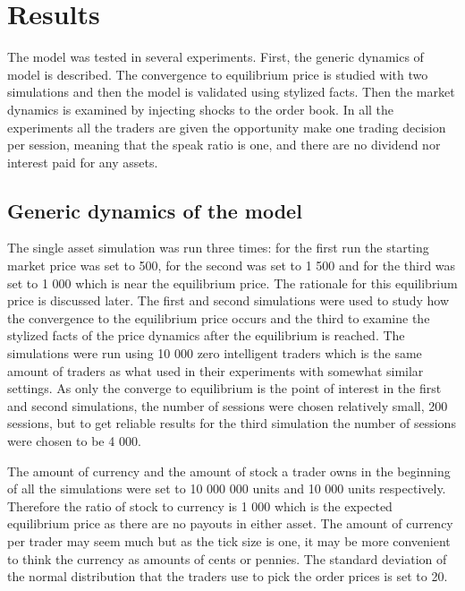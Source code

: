 
\section{Results}

The model was tested in several experiments. First, the generic dynamics of 
model is described. The convergence to equilibrium price is studied with two
simulations and then the model is validated using stylized facts. Then the
market dynamics is examined by injecting shocks to the order book. In all the experiments
all the traders are given the opportunity make one trading decision per session,
meaning that the speak ratio is one, and there are no dividend nor interest paid 
for any assets.

\subsection{Generic dynamics of the model}
The single asset simulation was run three times: for the first run
the starting market price was set to 500, for the second
was set to 1 500 and for the third was set to 1 000 which is near the equilibrium price. 
The rationale for this equilibrium price is discussed later.
The first and second simulations were
used to study how the convergence to the equilibrium price occurs
and the third to examine the stylized facts of the price
dynamics after the equilibrium is reached. The simulations were
run using 10 000 zero intelligent traders which is the 
same amount of traders as what \citet{Raberto05} used in their experiments
with somewhat similar settings. As only the converge to equilibrium is 
the point of interest in the first and second simulations, the number of sessions
were chosen relatively small, 200 sessions, but to get reliable results for
the third simulation the number of sessions were chosen to be 4 000.

The amount of currency and the amount of stock 
a trader owns in the beginning of all the simulations were set to
10 000 000 units and 10 000 units respectively. Therefore
the ratio of stock to currency is 1 000 which
is the expected equilibrium price as there are
no payouts in either asset. The amount of currency
per trader may seem much but as the tick size is one,
it may be more convenient to think the currency as amounts
of cents or pennies. The standard deviation of
the normal distribution that the traders use to pick the order prices
is set to 20.


